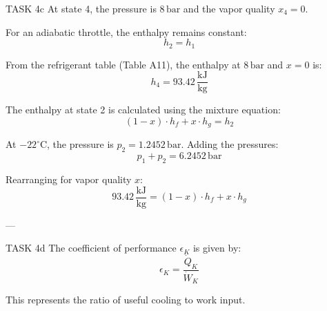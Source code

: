 TASK 4c  
At state 4, the pressure is \( 8 \, \text{bar} \) and the vapor quality \( x_4 = 0 \).  

For an adiabatic throttle, the enthalpy remains constant:  
\[
h_2 = h_1
\]  

From the refrigerant table (Table A11), the enthalpy at \( 8 \, \text{bar} \) and \( x = 0 \) is:  
\[
h_4 = 93.42 \, \frac{\text{kJ}}{\text{kg}}
\]  

The enthalpy at state 2 is calculated using the mixture equation:  
\[
(1-x) \cdot h_f + x \cdot h_g = h_2
\]  

At \( -22^\circ\text{C} \), the pressure is \( p_2 = 1.2452 \, \text{bar} \). Adding the pressures:  
\[
p_1 + p_2 = 6.2452 \, \text{bar}
\]  

Rearranging for vapor quality \( x \):  
\[
93.42 \, \frac{\text{kJ}}{\text{kg}} = (1-x) \cdot h_f + x \cdot h_g
\]  

---

TASK 4d  
The coefficient of performance \( \epsilon_K \) is given by:  
\[
\epsilon_K = \frac{\dot{Q}_K}{\dot{W}_K}
\]  

This represents the ratio of useful cooling to work input.